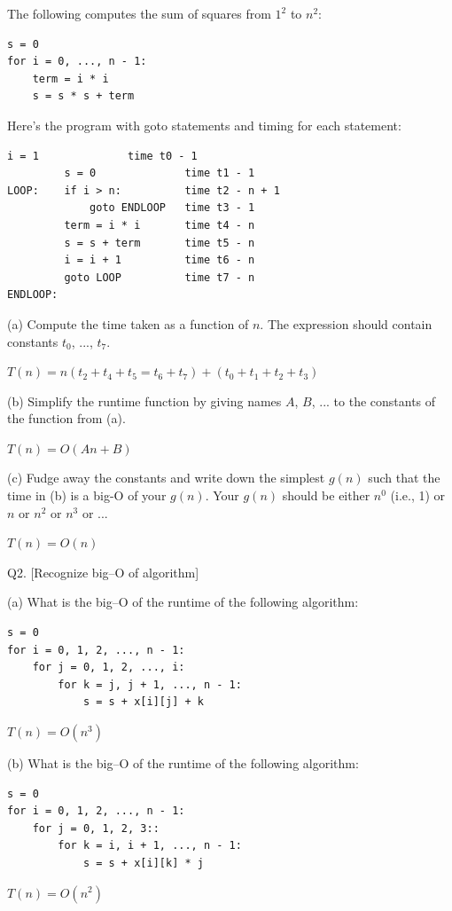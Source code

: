 The following computes the sum of squares from $1^2$ to $n^2$:
\begin{Verbatim}[frame=single]
s = 0
for i = 0, ..., n - 1:
    term = i * i
    s = s * s + term
\end{Verbatim}
Here's the program with goto statements and timing for each statement:
\begin{Verbatim}[frame=single]
         i = 1              time t0 - 1
         s = 0              time t1 - 1
LOOP:    if i > n:          time t2 - n + 1
             goto ENDLOOP   time t3 - 1
         term = i * i       time t4 - n
         s = s + term       time t5 - n
         i = i + 1          time t6 - n
         goto LOOP          time t7 - n
ENDLOOP:
\end{Verbatim}
(a) Compute the time taken as a function of $n$.
The expression should contain constants $t_0$, ..., $t_7$.
\\
\ANSWER
\begin{answerlong}
$T(n) = {n(t_2 + t_4 + t_5 = t_6 + t_7) + (t_0 + t_1 + t_2 + t_3)}$
\end{answerlong}

(b) Simplify the runtime function by giving names $A$, $B$, ...
to the constants of the function from (a).
\\
\ANSWER
\begin{answerlong}
$T(n) = O(An + B)$
\end{answerlong}

(c) Fudge away the constants and write down the simplest $g(n)$ such 
that the time in (b) is a big-O of your $g(n)$.
Your $g(n)$ should be either $n^0$ (i.e., 1) or $n$ or $n^2$ or $n^3$ or ...
\\
\ANSWER
\begin{answerlong}
$T(n) = O(n)$
\end{answerlong}

\newpage
Q2. [Recognize big--O of algorithm]

(a)
What is the big--O of the runtime of the following algorithm:
\begin{Verbatim}[frame=single]
s = 0
for i = 0, 1, 2, ..., n - 1:
    for j = 0, 1, 2, ..., i:
        for k = j, j + 1, ..., n - 1:
            s = s + x[i][j] + k
\end{Verbatim}
\ANSWER
\begin{answerlong}
$T(n) = O(n^3)$
\end{answerlong}

(b)
What is the big--O of the runtime of the following algorithm:
\begin{Verbatim}[frame=single]
s = 0
for i = 0, 1, 2, ..., n - 1:
    for j = 0, 1, 2, 3::
        for k = i, i + 1, ..., n - 1:
            s = s + x[i][k] * j
\end{Verbatim}
\ANSWER
\begin{answerlong}
$T(n) = O(n^2)$
\end{answerlong}

